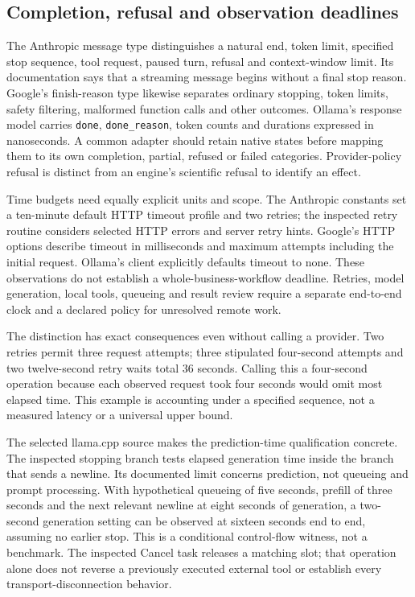 \subsection{Completion, refusal and observation deadlines}

The Anthropic message type distinguishes a natural end, token limit,
specified stop sequence, tool request, paused turn, refusal and context-window
limit. Its documentation says that a streaming message begins without a final
stop reason. Google's finish-reason type likewise separates ordinary stopping,
token limits, safety filtering, malformed function calls and other outcomes.
Ollama's response model carries \texttt{done}, \texttt{done\_reason}, token
counts and durations expressed in nanoseconds. A common adapter should
retain native states before mapping them to its own completion, partial,
refused or failed categories. Provider-policy refusal is distinct from an
engine's scientific refusal to identify an effect.
\citep{exec24_backend_anthropic,exec24_backend_google,exec24_backend_ollama}

Time budgets need equally explicit units and scope. The Anthropic constants
set a ten-minute default HTTP timeout profile and two retries; the inspected
retry routine considers selected HTTP errors and server retry hints. Google's
HTTP options describe timeout in milliseconds and maximum attempts including
the initial request. Ollama's client explicitly defaults timeout to none.
These observations do not establish a whole-business-workflow deadline.
Retries, model generation, local tools, queueing and result review require a
separate end-to-end clock and a declared policy for unresolved remote work.
\citep{exec24_backend_anthropic,exec24_backend_google,exec24_backend_ollama}

The distinction has exact consequences even without calling a provider. Two
retries permit three request attempts; three stipulated four-second attempts
and two twelve-second retry waits total 36 seconds. Calling this a
four-second operation because each observed request took four seconds would
omit most elapsed time. This example is accounting under a specified sequence,
not a measured latency or a universal upper bound.
\citep{exec24_backend_reference}

The selected llama.cpp source makes the prediction-time qualification
concrete. The inspected stopping branch tests elapsed generation time inside
the branch that sends a newline. Its documented limit concerns prediction,
not queueing and prompt processing. With hypothetical queueing of five
seconds, prefill of three seconds and the next relevant newline at eight
seconds of generation, a two-second generation setting can be observed at
sixteen seconds end to end, assuming no earlier stop. This is a conditional
control-flow witness, not a benchmark. The inspected Cancel task releases a
matching slot; that operation alone does not reverse a previously executed
external tool or establish every transport-disconnection behavior.
\citep{exec24_backend_llamacpp,exec24_backend_reference}

